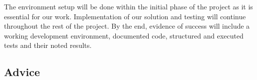 The environment setup will be done within the initial phase of the project as it is essential for our work. Implementation of our solution and testing will continue throughout the rest of the project. By the end, evidence of success will include a working development environment, documented code, structured and executed tests and their noted results.

\subsection{Advice}
\label{subsec:Advice}

